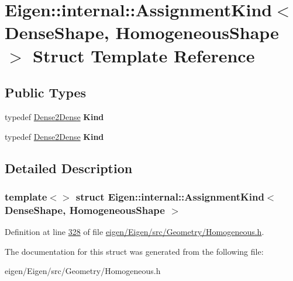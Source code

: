 \hypertarget{struct_eigen_1_1internal_1_1_assignment_kind_3_01_dense_shape_00_01_homogeneous_shape_01_4}{}\section{Eigen\+:\+:internal\+:\+:Assignment\+Kind$<$ Dense\+Shape, Homogeneous\+Shape $>$ Struct Template Reference}
\label{struct_eigen_1_1internal_1_1_assignment_kind_3_01_dense_shape_00_01_homogeneous_shape_01_4}
\subsection*{Public Types}
\begin{DoxyCompactItemize}
\item 
\mbox{\label{struct_eigen_1_1internal_1_1_assignment_kind_3_01_dense_shape_00_01_homogeneous_shape_01_4_af8e25accbdd082697ab50d60a5ff7668}} 
typedef \hyperlink{struct_eigen_1_1internal_1_1_dense2_dense}{Dense2\+Dense} {\bfseries Kind}
\item 
\mbox{\label{struct_eigen_1_1internal_1_1_assignment_kind_3_01_dense_shape_00_01_homogeneous_shape_01_4_af8e25accbdd082697ab50d60a5ff7668}} 
typedef \hyperlink{struct_eigen_1_1internal_1_1_dense2_dense}{Dense2\+Dense} {\bfseries Kind}
\end{DoxyCompactItemize}


\subsection{Detailed Description}
\subsubsection*{template$<$$>$\newline
struct Eigen\+::internal\+::\+Assignment\+Kind$<$ Dense\+Shape, Homogeneous\+Shape $>$}



Definition at line \hyperlink{eigen_2_eigen_2src_2_geometry_2_homogeneous_8h_source_l00328}{328} of file \hyperlink{eigen_2_eigen_2src_2_geometry_2_homogeneous_8h_source}{eigen/\+Eigen/src/\+Geometry/\+Homogeneous.\+h}.



The documentation for this struct was generated from the following file\+:\begin{DoxyCompactItemize}
\item 
eigen/\+Eigen/src/\+Geometry/\+Homogeneous.\+h\end{DoxyCompactItemize}
